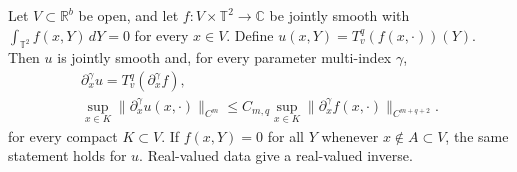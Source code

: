 \begin{proposition}
\label{prop:ns-inverse-parameters}
Let $V\subset\mathbb R^b$ be open, and let
$f:V\times\mathbb T^2\to\mathbb C$ be jointly smooth with
$\int_{\mathbb T^2}f(x,Y)\,dY=0$ for every $x\in V$.
Define $u(x,Y)=T_v^q(f(x,\cdot))(Y)$. Then $u$ is jointly
smooth and, for every parameter multi-index $\gamma$,
\[
 \begin{gathered}
 \partial_x^\gamma u=T_v^q(\partial_x^\gamma f),\\
 \sup_{x\in K}\|\partial_x^\gamma u(x,\cdot)\|_{C^m}
 \leq C_{m,q}\sup_{x\in K}
                \|\partial_x^\gamma f(x,\cdot)\|_{C^{m+q+2}}.
 \end{gathered}                                                  \tag{S16}
\]
for every compact $K\subset V$. If $f(x,Y)=0$ for all $Y$
whenever $x\notin A\subset V$, the same statement holds for $u$.
Real-valued data give a real-valued inverse.


\end{proposition}
